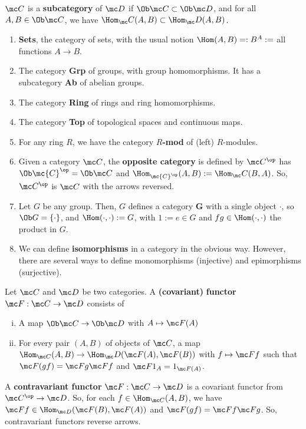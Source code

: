 \begin{defn}
    $\mc C$ is a \textbf{subcategory} of $\mc D$ if $\Ob \mc C \subset \Ob \mc D$, and for all $A,B \in \Ob \mc C$, we have $\Hom_\mc C(A,B) \subset \Hom _\mc D(A,B)$.
\end{defn}

\begin{ex}
    \begin{enumerate}
        \item \textbf{Sets}, the category of sets, with the usual notion $\Hom(A,B)=:B^A:=$ all functions $A \to B$.
        \item The category \textbf{Grp} of groups, with group homomorphisms. It has a subcategory \textbf{Ab} of abelian groups.
        \item The category \textbf{Ring} of rings and ring homomorphisms.
        \item The category \textbf{Top} of topological spaces and continuous maps.
        \item For any ring $R$, we have the category $R$\textbf{-mod} of (left) $R$-modules.
        \item Given a category $\mc C$, the \textbf{opposite category} is defined by $\mc C^{\op}$ has $\Ob \mc {C}^{\op}  =\Ob \mc C$ and $\Hom_{\mc {C}^{\op}}(A,B):= \Hom_\mc C(B,A) $. So, $\mc C^{\op}$ is $\mc C$ with the arrows reversed.
        \item Let $G$ be any group. Then, $G$ defines a category \textbf{G} with a single object $\cdot$, so $\Ob G = \{\cdot \}$, and $\Hom (\cdot,\cdot ):=G$, with $1 :=e \in G$ and $fg \in \Hom(\cdot,\cdot)$ the product in $G$.
        \item We can define \textbf{isomorphisms} in a category in the obvious way. However, there are several ways to define monomorphisms (injective) and epimorphisms (surjective).
    \end{enumerate}
\end{ex}

\begin{defn}
    Let $\mc C$ and $\mc D$ be two categories. A \textbf{(covariant)} \textbf{functor} $\mc F : \mc C \to \mc D$ consists of
    \begin{enumerate}[(i)]
        \item A map $\Ob \mc C \to \Ob \mc D$ with $A \mapsto \mc F(A)$
        \item For every pair $(A,B)$ of objects of $\mc C$, a map $\Hom_{\mc C}(A,B) \to \Hom_\mc D(\mc F(A), \mc F(B))$ with $f \mapsto \mc Ff$ such that $\mc F(gf) = \mc Fg \mc Ff$ and $\mc F1_A = 1_{\mc F(A)}$.
    \end{enumerate}
    A \textbf{contravariant functor} $\mc F : \mc C \to \mc D$ is a covariant functor from $\mc C^{\op} \to \mc D$. So, for each $f \in \Hom _{\mc C}(A,B)$, we have $\mc Ff \in \Hom _{\mc D}(\mc F(B), \mc F(A))$ and $\mc F(gf)=\mc Ff \mc Fg$. So, contravariant functors reverse arrows.
\end{defn}

